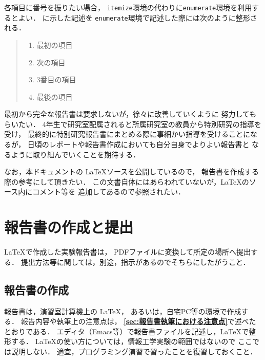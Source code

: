 \documentclass{ujarticle}[11pt]
\newcommand{\figref}[1]{\makebox{図~\ref{#1}}}
\begin{document}
    各項目に番号を振りたい場合，
    \verb|itemize|環境の代わりに\verb|enumerate|環境を利用するとよい．
    \figref{fig:verbatim環境による列挙の記述例}に示した記述を
    \verb|enumerate|環境で記述した際には次のように整形される．
    \begin{quote}
    \begin{enumerate}
      \item 最初の項目
      \item 次の項目
      \item 3番目の項目
      \item 最後の項目
    \end{enumerate}
    \end{quote}
     
    最初から完全な報告書は要求しないが，徐々に改善していくように
    努力してもらいたい．
    4年生で研究室配属されると所属研究室の教員から特別研究の指導を受け，
    最終的に特別研究報告書にまとめる際に事細かい指導を受けることになるが，
    日頃のレポートや報告書作成においても自分自身でよりよい報告書と
    なるように取り組んでいくことを期待する．
     
    なお，本ドキュメントの \LaTeX ソースを公開しているので，
    報告書を作成する際の参考にして頂きたい．
    この文書自体にはあらわれていないが，\LaTeX のソース内にコメント等を
    追加してあるので参照されたい．
     
     
    \section{報告書の作成と提出}
    \label{sec:報告書の作成と提出}
    \LaTeX で作成した実験報告書は，
    PDFファイルに変換して所定の場所へ提出する．
    提出方法等に関しては，別途，指示があるのでそちらにしたがうこと．
     
    \subsection{報告書の作成}
    報告書は，演習室計算機上の \LaTeX，
    あるいは，自宅PC等の環境で作成する．
    報告内容や執筆上の注意点は，
    {\bf \ref{sec:報告書執筆における注意点}}で述べたとおりである．
    エディタ（Emacs等）で報告書ファイルを記述し，\LaTeX で整形する．
    \LaTeX の使い方については，情報工学実験の範囲ではないので
    ここでは説明しない．
    適宜，プログラミング演習で習ったことを復習しておくこと．
     
\end{document}
